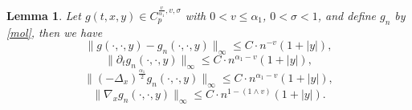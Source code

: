 \documentclass[11pt,reqno]{amsart}
\newtheorem{lemma}{\indent Lemma}[section]
\numberwithin{equation}{section}
\begin{document}
\begin{lemma}\label{L51}
	Let $g(t,x,y)\in C_{p}^{\frac{v}{\alpha_{1}}, v,\sigma }$ with $0<v\leq\alpha_{1}$, $0<\sigma<1$, and 
		 define $g_{n}$ by \eqref{mol}, then we have 
	\begin{equation}\label{5.57}
		\|g(\cdot,\cdot,y)-g_{n}(\cdot,\cdot,y)\|_{\infty}\leq C\cdot n^{-v}(1+|y|),
	\end{equation} 
	\begin{equation}\label{5.58-1}
		\|\partial_{t}g_{n}(\cdot,\cdot,y)\|_{\infty}\leq C\cdot n^{\alpha_{1}-v}(1+|y|), 
	\end{equation} 
	\begin{equation}\label{5.58-4}
		\|(-\Delta_{x})^{\frac{\alpha_{1}}{2}}g_{n}(\cdot,\cdot,y)\|_{\infty}\leq C\cdot n^{\alpha_{1}-v}(1+|y|),
	\end{equation} 
	\begin{equation}\label{5.58-3}
		\|\nabla_{x}g_ {n}(\cdot,\cdot,y)\|_{\infty}\leq C\cdot n^{1-(1\wedge v)}(1+|y|).
	\end{equation} 
\end{lemma}
\end{document}
